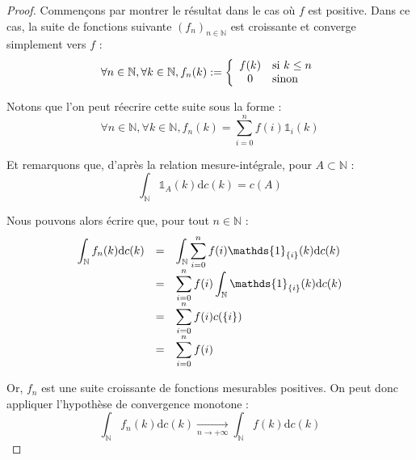 \documentclass[../integ-proba.tex]{subfiles}
\begin{document}
    \begin{proof}
        Commençons par montrer le résultat dans le cas où $f$ est positive.
        Dans ce cas, la suite de fonctions suivante $\left(f_n\right)_{n\in\mathbb{N}}$ est croissante et converge simplement vers $f$ :
        \begin{displaymath}
            \forall n \in \mathbb{N}, \forall k \in \mathbb{N}, f_n(k) :=
        \left\{
            \begin{array}{cl}
                f(k) & \textnormal{si } k \leq n\\
                0    & \textnormal{sinon}
            \end{array}
        \right.
        \end{displaymath}

        Notons que l'on peut réecrire cette suite sous la forme :
        \begin{displaymath}
            \forall n \in \mathbb{N}, \forall k \in \mathbb{N}, f_n(k) = \sum_{i=0}^n f(i) \mathds{1}_{i}(k)
        \end{displaymath}

        Et remarquons que, d'après la relation mesure-intégrale, pour $A \subset \mathbb{N}$ :
        \begin{displaymath}
            \int_\mathbb{N} \mathds{1}_{A}(k) \text{d} c(k) = c(A)
        \end{displaymath}

        Nous pouvons alors écrire que, pour tout $n \in \mathbb{N}$ :
        \begin{displaymath}
            {
        \everymath={\displaystyle}
        \begin{array}{rcl}
            \int_\mathbb{N} f_n(k)\text{d}c(k) & = & \int_\mathbb{N} \sum_{i=0}^n f(i) \mathds{1}_{\{i\}}(k) \text{d}c(k)\\
                                               & = & \sum_{i=0}^n f(i) \int_\mathbb{N} \mathds{1}_{\{i\}}(k) \text{d}c(k)\\
                                               & = & \sum_{i=0}^n f(i) c(\{i\})\\
                                               & = & \sum_{i=0}^n f(i)
        \end{array}
        }
        \end{displaymath}

        Or, $f_n$ est une suite croissante de fonctions mesurables positives.
        On peut donc appliquer l'hypothèse de convergence monotone :
        \begin{displaymath}
            \int_\mathbb{N} f_n(k)\text{d}c(k) \xrightarrow[n \to + \infty]{} \int_\mathbb{N} f(k)\text{d}c(k)
        \end{displaymath}


\end{proof}
\end{document}
